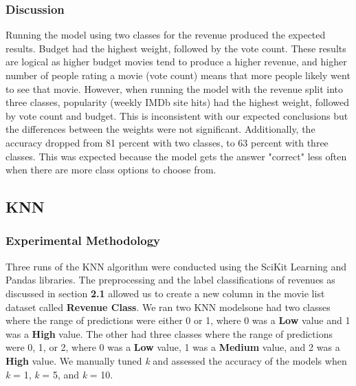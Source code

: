 \documentclass{article}
\begin{document}
\subsubsection{Discussion}
Running the model using two classes for the revenue produced the expected results. Budget had the highest weight, followed by the vote count. These results are logical as higher budget movies tend to produce a higher revenue, and higher number of people rating a movie (vote count) means that more people likely went to see that movie. However, when running the model with the revenue split into three classes, popularity (weekly IMDb site hits) had the highest weight, followed by vote count and budget. This is inconsistent with our expected conclusions but the differences between the weights were not significant.
Additionally, the accuracy dropped from 81 percent with two classes, to 63 percent with three classes. This was expected because the model gets the answer "correct" less often when there are more class options to choose from.


\subsection{KNN}
\subsubsection{Experimental Methodology}
Three runs of the KNN algorithm were conducted using the SciKit Learning and Pandas libraries. The preprocessing and the label classifications of revenues as discussed in section \textbf{2.1} allowed us to create a new column in the movie list dataset called \textbf{Revenue Class}. We ran two KNN models\textemdash one had two classes where the range of predictions were either 0 or 1, where 0 was a \textbf{Low} value and 1 was a \textbf{High} value. The other had three classes where the range of predictions were 0, 1, or 2, where 0 was a \textbf{Low} value, 1 was a \textbf{Medium} value, and 2 was a \textbf{High} value. We manually tuned \textit{k} and assessed the accuracy of the models when \textit{k} = 1, \textit{k} = 5, and \textit{k} = 10.
\end{document}

